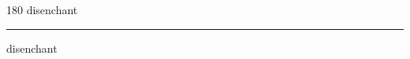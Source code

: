 
\begin{frame}
\begin{center}
\begin{turn}{180}
{\fontsize{2.5cm}{1em}\selectfont disenchant}
\end{turn}
\vspace{1em}\par  
\hrule
\vspace{1em}\par  
{\fontsize{2.5cm}{1em}\selectfont disenchant}
\end{center}
\end{frame}
